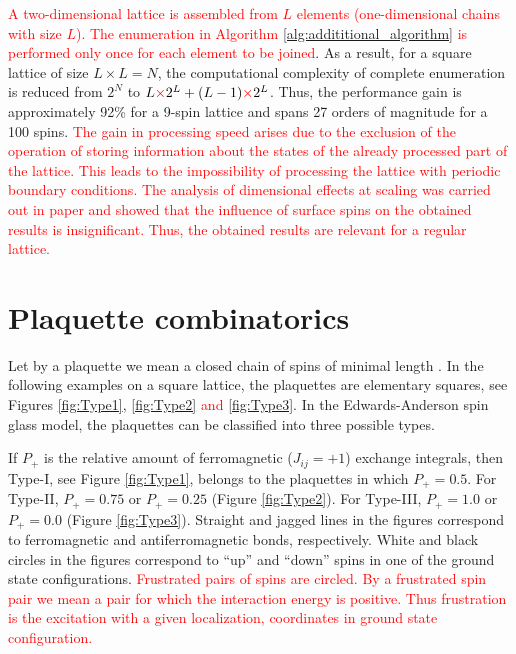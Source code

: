 \documentclass[preprint,12pt]{elsarticle}
\begin{document}
	\textcolor{red}{A two-dimensional lattice is assembled from $L$ elements (one-dimensional chains with size $L$). The enumeration in Algorithm \ref{alg:addititional_algorithm} is performed only once for each element to be joined}. As a result, for a square lattice of size $L \times L = N$, the computational complexity of complete enumeration is reduced from $2^{N}$ to $L \textcolor{red}{\times} 2^L + (L - 1) \textcolor{red}{\times} 2^L$. Thus, the performance gain is approximately 92\% for a 9-spin lattice and spans 27 orders of magnitude for a 100 spins. \textcolor{red}{The gain in processing speed arises due to the exclusion of the operation of storing information about the states of the already processed part of the lattice. This leads to the impossibility of processing the lattice with periodic boundary conditions. The analysis of dimensional effects at scaling was carried out in paper \cite{trukhin2024thermodynamic} and showed that the influence of surface spins on the obtained results is insignificant. Thus, the obtained results are relevant for a regular lattice.}
	
	\section{Plaquette combinatorics}
	
	Let by a plaquette we mean a closed chain of spins of minimal length \cite{lebrecht2015j}. In the following examples on a square lattice, the plaquettes are elementary squares, see Figures \ref{fig:Type1}, \ref{fig:Type2} \textcolor{red}{and} \ref{fig:Type3}. In the Edwards-Anderson spin glass model, the plaquettes can be classified into three possible types. 
	
	If $P_+$ is the relative amount of ferromagnetic ($J_{ij}=+1$) exchange integrals, then Type-I, see Figure \ref{fig:Type1}, belongs to the plaquettes in which $P_+=0.5$. For Type-II, $P_+=0.75$ or $P_+=0.25$ (Figure \ref{fig:Type2}). For Type-III, $P_+=1.0$ or $P_+=0.0$ (Figure \ref{fig:Type3}). Straight and jagged lines in the figures correspond to ferromagnetic and antiferromagnetic bonds, respectively. White and black circles in the figures correspond to ``up'' and ``down'' spins in one of the ground state configurations. \textcolor{red}{Frustrated pairs of spins are circled. By a frustrated spin pair we mean a pair for which the interaction energy is positive. Thus frustration is the excitation with a given localization, coordinates in ground state configuration.}
	
\end{document}
